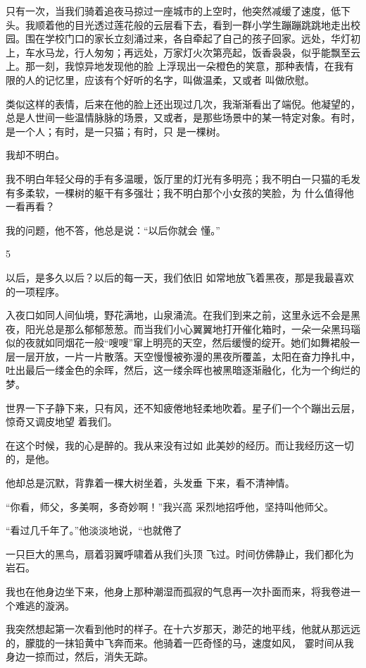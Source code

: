 \documentclass{article}
\begin{document}
只有一次，当我们骑着追夜马掠过一座城市的上空时，他突然减缓了速度，低下头。我顺着他的目光透过莲花般的云层看下去，看到一群小学生蹦蹦跳跳地走出校园。围在学校门口的家长立刻涌过来，各自牵起了自己的孩子回家。远处，华灯初上，车水马龙，行人匆匆；再远处，万家灯火次第亮起，饭香袅袅，似乎能飘至云上。那一刻，我惊异地发现他的脸
\newpage
上浮现出一朵橙色的笑意，那种表情，在我有限的人的记忆里，应该有个好听的名字，叫做温柔，又或者
叫做欣慰。 

类似这样的表情，后来在他的脸上还出现过几次，我渐渐看出了端倪。他凝望的，总是人世间一些温情脉脉的场景，又或者，是那些场景中的某一特定对象。有时，是一个人；有时，是一只猫；有时，只
是一棵树。 


我却不明白。 

我不明白年轻父母的手有多温暖，饭厅里的灯光有多明亮；我不明白一只猫的毛发有多柔软，一棵树的躯干有多强壮；我不明白那个小女孩的笑脸，为
什么值得他一看再看？ 

我的问题，他不答，他总是说：“以后你就会
懂。” 


\newpage

5 

以后，是多久以后？以后的每一天，我们依旧
如常地放飞着黑夜，那是我最喜欢的一项程序。 

入夜口如同人间仙境，野花满地，山泉涌流。在我们到来之前，这里永远不会是黑夜，阳光总是那么郁郁葱葱。而当我们小心翼翼地打开催化箱时，一朵一朵黑玛瑙似的夜就如同烟花一般“嗖嗖”窜上明亮的天空，然后缓慢的绽开。她们如舞裙般一层一层开放，一片一片散落。天空慢慢被弥漫的黑夜所覆盖，太阳在奋力挣扎中，吐出最后一缕金色的余晖，然后，这一缕余晖也被黑暗逐渐融化，化为一个绚烂的
梦。 

世界一下子静下来，只有风，还不知疲倦地轻柔地吹着。星子们一个个蹦出云层，惊奇又调皮地望
着我们。 

在这个时候，我的心是醉的。我从来没有过如
此美妙的经历。而让我经历这一切的，是他。 

\newpage

他却总是沉默，背靠着一棵大树坐着，头发垂
下来，看不清神情。 

“你看，师父，多美啊，多奇妙啊！”我兴高
采烈地招呼他，坚持叫他师父。 

“看过几千年了。”他淡淡地说，“也就倦了

一只巨大的黑鸟，扇着羽翼呼啸着从我们头顶
飞过。时间仿佛静止，我们都化为岩石。 

我也在他身边坐下来，他身上那种潮湿而孤寂的气息再一次扑面而来，将我卷进一个难逃的漩涡。

我突然想起第一次看到他时的样子。在十六岁那天，渺茫的地平线，他就从那远远的，朦胧的一抹铅黄中飞奔而来。他骑着一匹奇怪的马，速度如风，
霎时间从我身边一掠而过，然后，消失无踪。 
\end{document}
